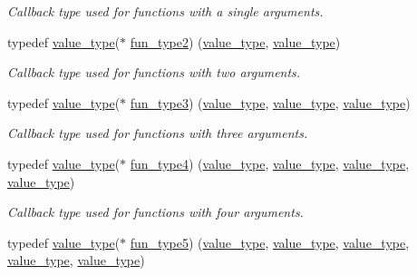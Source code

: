 \begin{DoxyCompactItemize}
\begin{DoxyCompactList}\small\item\em Callback type used for functions with a single arguments. \end{DoxyCompactList}\item 
typedef \hyperlink{namespacemu_a17d4f113a4b88b8d971cca8ddbbe8a47}{value\+\_\+type}($\ast$ \hyperlink{namespacemu_abd9aed5816d33116d687f5becd85b38f}{fun\+\_\+type2}) (\hyperlink{namespacemu_a17d4f113a4b88b8d971cca8ddbbe8a47}{value\+\_\+type}, \hyperlink{namespacemu_a17d4f113a4b88b8d971cca8ddbbe8a47}{value\+\_\+type})
\begin{DoxyCompactList}\small\item\em Callback type used for functions with two arguments. \end{DoxyCompactList}\item 
typedef \hyperlink{namespacemu_a17d4f113a4b88b8d971cca8ddbbe8a47}{value\+\_\+type}($\ast$ \hyperlink{namespacemu_ac89cbeb049bfe0ac38464d9420bf3201}{fun\+\_\+type3}) (\hyperlink{namespacemu_a17d4f113a4b88b8d971cca8ddbbe8a47}{value\+\_\+type}, \hyperlink{namespacemu_a17d4f113a4b88b8d971cca8ddbbe8a47}{value\+\_\+type}, \hyperlink{namespacemu_a17d4f113a4b88b8d971cca8ddbbe8a47}{value\+\_\+type})
\begin{DoxyCompactList}\small\item\em Callback type used for functions with three arguments. \end{DoxyCompactList}\item 
typedef \hyperlink{namespacemu_a17d4f113a4b88b8d971cca8ddbbe8a47}{value\+\_\+type}($\ast$ \hyperlink{namespacemu_ada318070796bde216079092cfdcf6fe1}{fun\+\_\+type4}) (\hyperlink{namespacemu_a17d4f113a4b88b8d971cca8ddbbe8a47}{value\+\_\+type}, \hyperlink{namespacemu_a17d4f113a4b88b8d971cca8ddbbe8a47}{value\+\_\+type}, \hyperlink{namespacemu_a17d4f113a4b88b8d971cca8ddbbe8a47}{value\+\_\+type}, \hyperlink{namespacemu_a17d4f113a4b88b8d971cca8ddbbe8a47}{value\+\_\+type})
\begin{DoxyCompactList}\small\item\em Callback type used for functions with four arguments. \end{DoxyCompactList}\item 
typedef \hyperlink{namespacemu_a17d4f113a4b88b8d971cca8ddbbe8a47}{value\+\_\+type}($\ast$ \hyperlink{namespacemu_a7a01724f9caaf71f99e46b49e75b3bc3}{fun\+\_\+type5}) (\hyperlink{namespacemu_a17d4f113a4b88b8d971cca8ddbbe8a47}{value\+\_\+type}, \hyperlink{namespacemu_a17d4f113a4b88b8d971cca8ddbbe8a47}{value\+\_\+type}, \hyperlink{namespacemu_a17d4f113a4b88b8d971cca8ddbbe8a47}{value\+\_\+type}, \hyperlink{namespacemu_a17d4f113a4b88b8d971cca8ddbbe8a47}{value\+\_\+type}, \hyperlink{namespacemu_a17d4f113a4b88b8d971cca8ddbbe8a47}{value\+\_\+type})

\end{DoxyCompactItemize}
